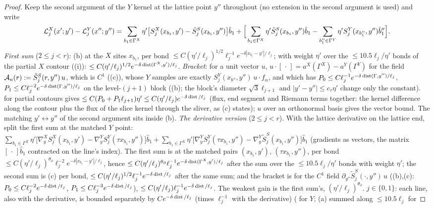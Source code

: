 \begin{proof}
Keep the second argument of the $Y$ kernel at the lattice point $y''$ throughout (no extension in the second argument is used) and write
\[
\mathcal L^X_j(x';y')-\mathcal L^Y_j(x'';y'')=\sum_{b_1\in\Gamma^X}\eta'\big[S^X_j(x_{b_1},y')-\tilde S^S_j(x_{b_1},y'')\big]\hat b_1
+\Big[\sum_{b_1\in\Gamma^X}\eta'\tilde S^S_j(x_{b_1},y'')\hat b_1-\sum_{b''_1\in\Gamma^Y}\eta'S^Y_j(x_{b''_1},y'')\hat b''_1\Big].
\]
\emph{First sum} ($2\le j<r$): (b) at the $X$ sites $x_{b_1}$, per bond $\le C(\eta'/\ell_j)^{1/2}\ell_j^{-1}e^{-\delta|x_{b_1}-y'|/\ell_j}$; with weight $\eta'$ over the $\le10.5\ell_j/\eta'$ bonds of the partial $X$ contour ((i)): $\le C(\eta'/\ell_j)^{1/2}e^{-\delta\operatorname{dist}(\Gamma^X,y')/\ell_j}$. \emph{Bracket}: for a unit vector $u$, $u\cdot[\,\cdot\,]=a^X(\Gamma^X)-a^Y(\Gamma^Y)$ for the field $\mathcal A_u(r):=\tilde S^S_j(r,y'')\,u$, which is $C^1$ ((c)), whose $Y$ samples are exactly $S^Y_j(x_{b''},y'')\,u\cdot f_\alpha$, and which has $P_0\le C\ell_j^{-1}e^{-\delta\operatorname{dist}(\Gamma,y'')/\ell_j}$, $P_1\le C\ell_j^{-2}e^{-\delta\operatorname{dist}(\Gamma,y'')/\ell_j}$ on the level-$(j+1)$ block ((b); the block's diameter $\sqrt3\ell_{j+1}$ and $|y'-y''|\le c_\tau\eta'$ change only the constant).  for partial contours gives $\le C(P_0+P_1\ell_{j+1})\eta'\le C(\eta'/\ell_j)e^{-\delta\operatorname{dist}/\ell_j}$ (flux, end segment and Riemann terms together: the kernel difference along the contour plus the flux of the slice kernel through the sliver, as (c) states); $u$ over an orthonormal basis gives the vector bound. The matching $y'\leftrightarrow y''$ of the second argument sits inside (b). \emph{The derivative version} ($2\le j<r$). With the lattice derivative on the lattice end, split the first sum at the matched $Y$ point: $\sum_{b_1\in\Gamma^X}\eta'\big[\nabla^X_yS^X_j(x_{b_1},y')-\nabla^Y_yS^Y_j(\tau x_{b_1},y'')\big]\hat b_1+\sum_{b_1\in\Gamma^X}\eta'\big[\nabla^Y_yS^Y_j(\tau x_{b_1},y'')-\nabla^Y_y\tilde S^S_j(x_{b_1},y'')\big]\hat b_1$ (gradients as vectors, the matrix $[\,\cdot\,]\hat b_1$ contracted on the line's index). The first sum is  at the matched pairs $(x_{b_1},y')$, $(\tau x_{b_1},y'')$, per bond $\le C(\eta'/\ell_j)^{\theta_\partial}\ell_j^{-2}e^{-\delta|x_{b_1}-y'|/\ell_j}$, hence $\le C(\eta'/\ell_j)^{\theta_\partial}\ell_j^{-1}e^{-\delta\operatorname{dist}(\Gamma^X,y')/\ell_j}$ after the sum over the $\le10.5\ell_j/\eta'$ bonds with weight $\eta'$; the second sum is (c) per bond, $\le C(\eta'/\ell_j)^{1/2}\ell_j^{-1}e^{-\delta\operatorname{dist}/\ell_j}$ after the same sum; and the bracket is  for the $C^1$ field $\partial_{y''}\tilde S^S_j(\cdot,y'')\,u$ ((b),(c): $P_0\le C\ell_j^{-2}e^{-\delta\operatorname{dist}/\ell_j}$, $P_1\le C\ell_j^{-3}e^{-\delta\operatorname{dist}/\ell_j}$), $\le C(\eta'/\ell_j)\ell_j^{-1}e^{-\delta\operatorname{dist}/\ell_j}$. The weakest gain is the first sum's, $(\eta'/\ell_j)^{\theta_\partial}$. \emph{$j\in\{0,1\}$}: each line, also with the derivative, is bounded separately by $Ce^{-\delta\operatorname{dist}/\ell_j}$ (times $\ell_j^{-1}$ with the derivative) (\cite[(3.64)]{K1} for $Y$; (a) summed along $\le10.5\ell_j$ for 
\end{proof}
